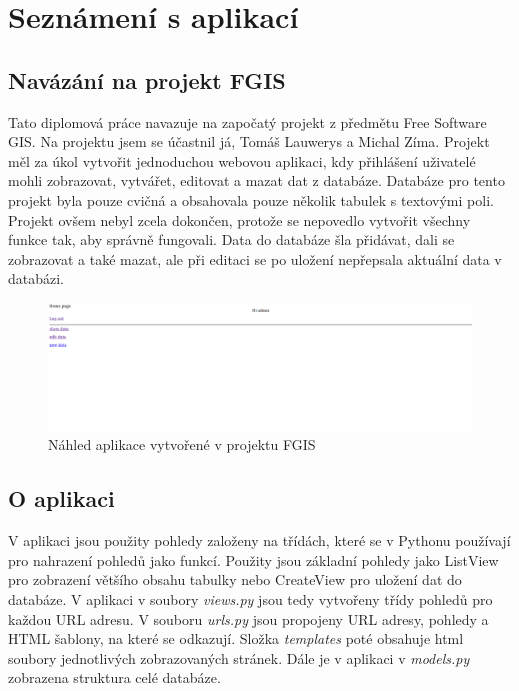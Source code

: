 \chapter{Seznámení s aplikací}
\label{3-seznameni-s-aplikaci}

\section{Navázání na projekt FGIS}

Tato diplomová práce navazuje na započatý projekt z předmětu Free
Software GIS. Na projektu jsem se účastnil já, Tomáš Lauwerys a Michal
Zíma. Projekt měl za úkol vytvořit jednoduchou webovou aplikaci, kdy
přihlášení uživatelé mohli zobrazovat, vytvářet, editovat a mazat dat
z databáze. Databáze pro tento projekt byla pouze cvičná a obsahovala
pouze několik tabulek s textovými poli. Projekt ovšem nebyl zcela
dokončen, protože se nepovedlo vytvořit všechny funkce tak, aby
správně fungovali. Data do databáze šla přidávat, dali se zobrazovat a
také mazat, ale při editaci se po uložení nepřepsala aktuální data v
databázi.

\begin{figure}[H] \centering
    \includegraphics[width=400pt]{./pictures/4-nahled-menu-fgis.PNG}
    \caption[Náhled aplikace vytvořené v projektu FGIS]{Náhled aplikace vytvořené v projektu FGIS}
	\label{fig:Náhled aplikace}              
\end{figure}

 \newpage
 
 \section{O aplikaci}

 V aplikaci jsou použity pohledy založeny na třídách, které se v
 Pythonu používají pro nahrazení pohledů jako funkcí. Použity jsou
 základní pohledy jako ListView pro zobrazení většího obsahu tabulky
 nebo CreateView pro uložení dat do databáze. V aplikaci v soubory
 \emph{views.py} jsou tedy vytvořeny třídy pohledů pro každou URL
 adresu. V souboru \emph{urls.py} jsou propojeny URL adresy, pohledy a
 HTML šablony, na které se odkazují. Složka \emph{templates} poté
 obsahuje html soubory jednotlivých zobrazovaných stránek. Dále je v
 aplikaci v \emph{models.py} zobrazena struktura celé databáze.

